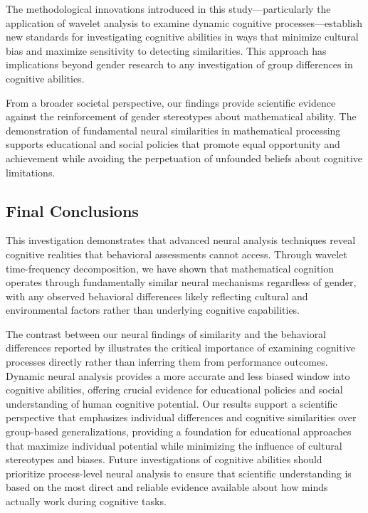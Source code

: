 \documentclass[pdflatex,reference]{sn-jnl}%
\theoremstyle{thmstyleone}%
\theoremstyle{thmstyletwo}%
\theoremstyle{thmstylethree}%
\begin{document}
The methodological innovations introduced in this study—particularly the application of wavelet analysis to examine dynamic cognitive processes—establish new standards for investigating cognitive abilities in ways that minimize cultural bias and maximize sensitivity to detecting similarities. This approach has implications beyond gender research to any investigation of group differences in cognitive abilities.

From a broader societal perspective, our findings provide scientific evidence against the reinforcement of gender stereotypes about mathematical ability. The demonstration of fundamental neural similarities in mathematical processing supports educational and social policies that promote equal opportunity and achievement while avoiding the perpetuation of unfounded beliefs about cognitive limitations.


\subsection{Final Conclusions}
This investigation demonstrates that advanced neural analysis techniques reveal cognitive realities that behavioral assessments cannot access. Through wavelet time-frequency decomposition, we have shown that mathematical cognition operates through fundamentally similar neural mechanisms regardless of gender, with any observed behavioral differences likely reflecting cultural and environmental factors rather than underlying cognitive capabilities.

The contrast between our neural findings of similarity and the behavioral differences reported by \cite{martinot2025mathematical} illustrates the critical importance of examining cognitive processes directly rather than inferring them from performance outcomes. Dynamic neural analysis provides a more accurate and less biased window into cognitive abilities, offering crucial evidence for educational policies and social understanding of human cognitive potential.
Our results support a scientific perspective that emphasizes individual differences and cognitive similarities over group-based generalizations, providing a foundation for educational approaches that maximize individual potential while minimizing the influence of cultural stereotypes and biases. Future investigations of cognitive abilities should prioritize process-level neural analysis to ensure that scientific understanding is based on the most direct and reliable evidence available about how minds actually work during cognitive tasks.
\end{document}
